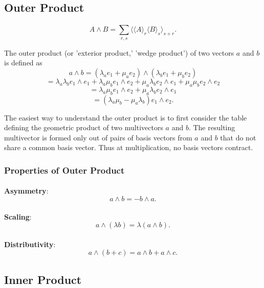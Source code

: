 \documentclass{article}
\begin{document}

\subsection{\textbf{Outer Product}}

\paragraph{}
    $$A \wedge B = \sum_{r,s} \langle \langle A \rangle_{r} \langle B \rangle_{s} \rangle_{s + r}.$$
    
The outer product (or 'exterior product,' 'wedge product') of two vectors $a$ and $b$ is defined as 
$$a \wedge b = (\lambda_a e_1 + \mu_a e_2) \wedge (\lambda_b e_1 + \mu_b e_2)$$
$$= \lambda_a \lambda_b e_1 \wedge e_1 + \lambda_a \mu_b e_1 \wedge e_2 + \mu_a \lambda_b e_2 \wedge e_1 + \mu_a \mu_b e_2 \wedge e_2$$
$$= \lambda_a \mu_b e_1 \wedge e_2 + \mu_a \lambda_b e_2 \wedge e_1$$
$$= (\lambda_a \mu_b - \mu_a \lambda_b) e_1 \wedge e_2.$$

The easiest way to understand the outer product is to first consider the table defining the geometric product of two multivectors $a$ and $b$. 
The resulting multivector is formed only out of pairs of basis vectors from $a$ and $b$ that do not share a common basis vector.
Thus at multiplication, no basis vectors contract.

\subsubsection{\textbf{Properties of Outer Product}}

\paragraph{}\textbf{Asymmetry}:
$$a \wedge b = -b \wedge a.$$
\paragraph{}\textbf{Scaling}:
$$a \wedge (\lambda b) = \lambda (a \wedge b).$$
\paragraph{}\textbf{Distributivity}:
$$a \wedge (b + c) = a \wedge b + a \wedge c.$$


\subsection{\textbf{Inner Product}}
\end{document}
